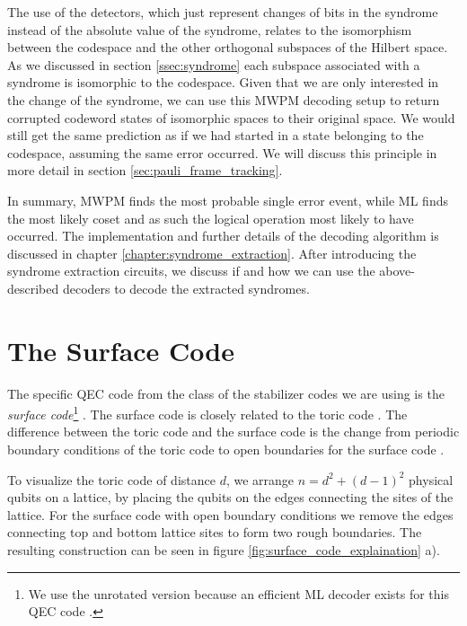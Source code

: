 The use of the detectors, which just represent changes of bits in the syndrome instead of the absolute value of the syndrome, 
relates to the isomorphism between the codespace and the other orthogonal subspaces of the Hilbert space.
As we discussed in section \ref{ssec:syndrome} each subspace associated with a syndrome is isomorphic to the codespace. 
Given that we are only interested in the change of the syndrome, we can use this MWPM decoding setup to return corrupted codeword states of isomorphic spaces to their original space.
We would still get the same prediction as if we had started in a state belonging to the codespace, assuming the same error occurred.
We will discuss this principle in more detail in section \ref{sec:pauli_frame_tracking}.

In summary, MWPM finds the most probable single error event, 
while ML finds the most likely coset and as such the logical operation most likely to have occurred.
The implementation and further details of the decoding algorithm is discussed in chapter \ref{chapter:syndrome_extraction}.
After introducing the syndrome extraction circuits, we discuss if and how we can use the above-described decoders to decode the extracted syndromes.


\section{The Surface Code}\label{sec:kitaev_surface_code}

The specific QEC code from the class of the stabilizer codes we are using is the \emph{surface code}\footnote{
    We use the unrotated version because an efficient ML decoder exists for this QEC code \cite{efficient_decoding_algorithm}.
    } \cite{kitaev_surface_code,other_surface_code_paper}. 
The surface code is closely related to the toric code \cite{kitaev_toric_code}.
The difference between the toric code and the surface code is the change from periodic boundary conditions of the toric code to open boundaries for the surface code \cite{topological_quantum_memory}.

To visualize the toric code of distance $d$, we arrange $n=d^2 + (d-1)^2$ physical qubits on a lattice,
by placing the qubits on the edges connecting the sites of the lattice.
For the surface code with open boundary conditions we remove the edges connecting top and bottom lattice sites to form two rough boundaries.
The resulting construction can be seen in figure \ref{fig:surface_code_explaination} a).

